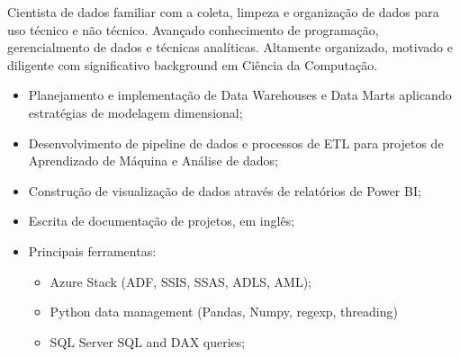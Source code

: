 \documentclass[10pt,a4paper]{altacv}
\begin{document}
\tagline{}

%

\begin{fullwidth}
\makecvheader
\end{fullwidth}

%



\justifying
    Cientista de dados familiar com a coleta, limpeza e organização de dados para uso técnico e não técnico. Avançado conhecimento de programação, gerencialmento de dados e técnicas analíticas. Altamente organizado, motivado e diligente com significativo background em Ciência da Computação.






\begin{itemize}
	\item Planejamento e implementação de Data Warehouses e Data Marts aplicando estratégias de modelagem dimensional;
	\item Desenvolvimento de pipeline de dados e processos de ETL para projetos de Aprendizado de Máquina e Análise de dados;
	\item Construção de visualização de dados através de relatórios de Power BI;
	\item Escrita de documentação de projetos, em inglês;
	\item Principais ferramentas:
	\begin{itemize}
	    \item Azure Stack (ADF, SSIS, SSAS, ADLS, AML);
	    \item Python data management (Pandas, Numpy, regexp, threading)
	    \item SQL Server SQL and DAX queries;
	\end{itemize}
\end{itemize}
\end{document}

